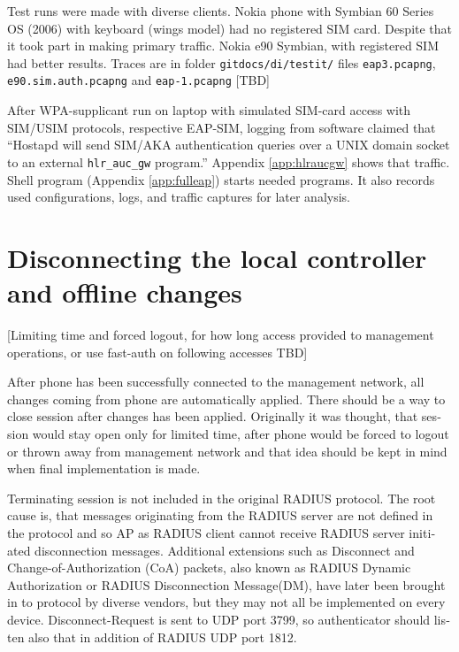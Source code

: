 \documentclass[12pt,a4paper,english]{tutthesis}
\begin{document}
\begin{otherlanguage}{english}
Test runs were made with diverse clients.
Nokia phone with Symbian 60 Series OS (2006) with keyboard
(wings model) had no registered SIM card. Despite that it took part in making
primary traffic.
Nokia e90 Symbian, with registered SIM had better results. Traces
are in folder \verb~gitdocs/di/testit/~ files \verb~eap3.pcapng~,
  \verb~e90.sim.auth.pcapng~ and \verb~eap-1.pcapng~  [TBD]

After WPA-supplicant run on laptop with simulated SIM-card access 
with SIM/USIM protocols, respective EAP-SIM, logging 
from software claimed that ``Hostapd will send SIM/AKA authentication
queries over a UNIX domain socket to an external \verb~hlr_auc_gw~ program.''
Appendix \ref{app:hlraucgw}   shows that traffic.
Shell program (Appendix \ref{app:fulleap}) starts needed programs. It also records used
configurations, logs, and traffic captures for later analysis.

\section{Disconnecting the local controller and offline changes}
\label{sec-5-3}
\label{sec:disconnections}
[Limiting time and forced logout, for how long access provided to
management operations, or use fast-auth on following accesses TBD]

After phone has been successfully connected to the management network,
all changes coming from 
phone are automatically applied. There should be a way to close
session after changes has been applied. Originally it was thought,
that session would stay open only for limited time, after phone would
be forced to logout or thrown away from management network and 
that idea should be kept in mind when final implementation is made.



Terminating session is not included in the original RADIUS protocol.
The root cause is, that 
messages originating from the RADIUS server are not
defined in the protocol and so AP as RADIUS client cannot receive
RADIUS server initiated disconnection messages. Additional extensions
such as Disconnect and Change-of-Authorization (CoA) packets, also
known as RADIUS Dynamic Authorization or RADIUS Disconnection
Message(DM),  have later been brought in\cite{rfc5176} to protocol by
diverse vendors, but they may not all be implemented on every device. 
Disconnect-Request is sent to UDP port 3799, so authenticator should
listen also that in addition of RADIUS UDP port 1812.







\end{otherlanguage}
\end{document}
